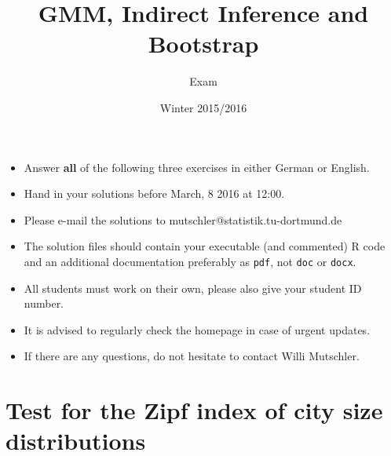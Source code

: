 \documentclass{article}
\begin{document}
\title{GMM, Indirect Inference and Bootstrap}
\author{Exam}
\date{Winter 2015/2016}
\maketitle

\begin{itemize}
\item Answer \textbf{all} of the following three exercises in either German or English.

\item Hand in your solutions before March, 8 2016 at 12:00.

\item Please e-mail the solutions to mutschler@statistik.tu-dortmund.de

\item The solution files should contain your executable (and commented) R code and an additional documentation preferably as \texttt{pdf}, not \texttt{doc} or \texttt{docx}.

\item All students must work on their own, please also give your student ID number.

\item It is advised to regularly check the homepage in case of urgent updates.
\item If there are any questions, do not hesitate to contact Willi Mutschler.
\end{itemize}

\newpage
\section{Test for the Zipf index of city size distributions}
\end{document}
